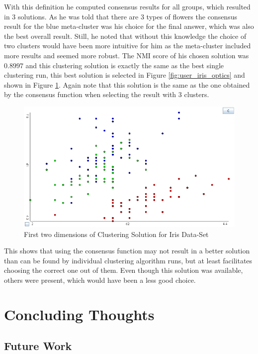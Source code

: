\documentclass[
	a4paper,
	english,
	twoside,
	openright,               
	11pt                            
	]{report}
\begin{document}
With this definition he computed consensus results for all groups, which resulted in 3 solutions. As he was told that there are 3 types of flowers the consensus result for the blue meta-cluster was his choice for the final answer, which was also the best overall result. Still, he noted that without this knowledge the choice of two clusters would have been more intuitive for him as the meta-cluster included more results and seemed more robust. The NMI score of his chosen solution was $0.8997$ and this clustering solution is exactly the same as the best single clustering run, this best solution is selected in Figure \ref{fig:user_iris_optics} and shown in Figure \ref{fig:user_iris_best}. Again note that this solution is the same as the one obtained by the consensus function when selecting the result with $3$ clusters.

\begin{figure}[h]
	\centering
	\includegraphics[scale=.4]{user_iris_best}
	\caption{First two dimensions of Clustering Solution for Iris Data-Set}
	\label{fig:user_iris_best}
\end{figure}

This shows that using the consensus function may not result in a better solution than can be found by individual clustering algorithm runs, but at least facilitates choosing the correct one out of them. Even though this solution was available, others were present, which would have been a less good choice.

\part{Concluding Thoughts}

\chapter{Future Work}\label{cha:futurework}
\end{document}
